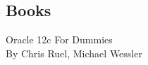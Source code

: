 
\setcounter{secnumdepth}{0}
\subsection{Books}

Oracle 12c For Dummies\\
By Chris Ruel, Michael Wessler\\
\\


